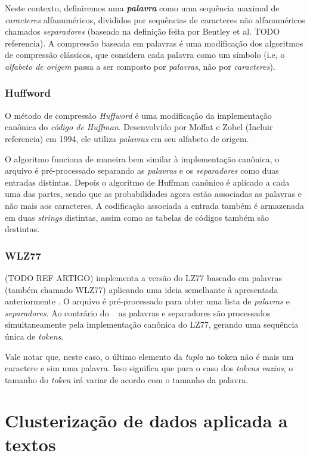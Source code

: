 Neste contexto, definiremos uma \textbf{\emph{palavra}} como uma sequência maximal de \emph{caracteres} alfanuméricos, divididos por sequências de caracteres não alfanuméricos chamados \emph{separadores} (baseado na definição feita por Bentley et al. TODO referencia).
A compressão baseada em palavras é uma modificação dos algoritmos de compressão clássicos, que considera cada palavra como um símbolo (i.e, o \emph{alfabeto de origem} passa a ser composto por \emph{palavras}, não por \emph{caracteres}).

\subsection{Huffword} \label{sub:huffw}
O método de compressão \emph{Huffword} é uma modificação da implementação canônica do \emph{código de Huffman}. 
Desenvolvido por Moffat e Zobel (Incluir referencia) em 1994, ele utiliza \emph{palavras} em seu alfabeto de origem.

O algoritmo funciona de maneira bem similar à implementação canônica, o arquivo é pré-processado separando as \emph{palavras} e os \emph{separadores} como duas entradas distintas.
Depois o algoritmo de Huffman canônico é aplicado a cada uma das partes, sendo que as probabilidades agora estão associadas as palavras e não mais aos caracteres. 
A codificação associada a entrada também é armazenada em duas \emph{strings} distintas, assim como as tabelas de códigos também são destintas.
 
 \subsection{WLZ77}
 (TODO REF ARTIGO) implementa a versão do LZ77 baseado em palavras (também chamado WLZ77) aplicando uma ideia semelhante à apresentada anteriormente . 
 O arquivo é pré-processado para obter uma lista de \emph{palavras} e \emph{separadores}. 
 Ao contrário do ~ as palavras e separadores são processados simultaneamente pela implementação canônica do LZ77, gerando uma sequência única de \emph{tokens}.
 
 Vale notar que, neste caso, o último elemento da \emph{tupla} no token não é mais um caractere e sim uma palavra. Isso significa que para o caso dos \emph{tokens vazios}, o tamanho do \emph{token} irá variar de acordo com o tamanho da palavra.
 
 
 \chapter{Clusterização de dados aplicada a textos}
 

